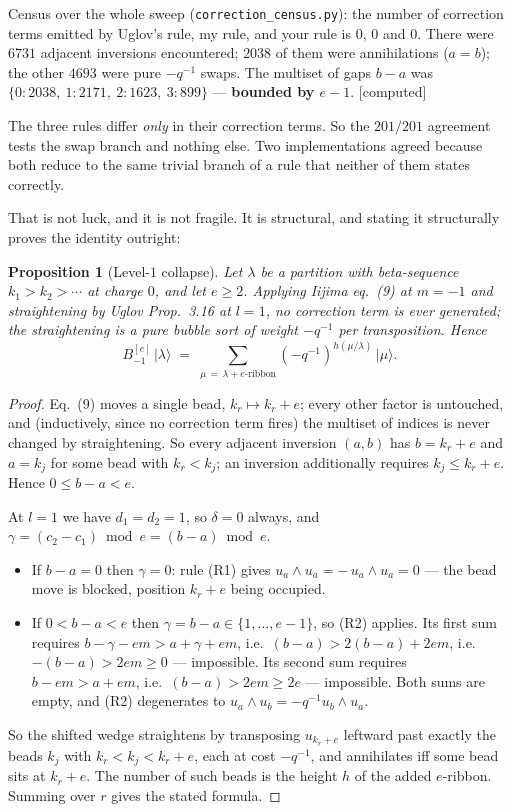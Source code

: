 \documentclass[11pt,a4paper]{article}
\newtheorem{proposition}{Proposition}
\theoremstyle{definition}
\newcommand{\gradecomputed}{\textsf{[computed]}}
\begin{document}
Census over the whole sweep (\texttt{correction\_census.py}): the number of correction
terms emitted by Uglov's rule, my rule, and your rule is $0$, $0$ and $0$. There were
$6731$ adjacent inversions encountered; $2038$ of them were annihilations ($a = b$); the
other $4693$ were pure $-q^{-1}$ swaps. The multiset of gaps $b-a$ was
$\{0 : 2038,\ 1 : 2171,\ 2 : 1623,\ 3 : 899\}$ --- \textbf{bounded by $e-1$}. \gradecomputed

The three rules differ \emph{only} in their correction terms. So the $201/201$ agreement
tests the swap branch and nothing else. Two implementations agreed because both reduce
to the same trivial branch of a rule that neither of them states correctly.

That is not luck, and it is not fragile. It is structural, and stating it structurally
proves the identity outright:

\begin{proposition}[Level-$1$ collapse]\label{prop:collapse}
Let $\lambda$ be a partition with beta-sequence $k_1 > k_2 > \cdots$ at charge $0$, and
let $e \ge 2$. Applying Iijima eq.~(9) at $m = -1$ and straightening by Uglov Prop.~3.16
at $l = 1$, no correction term is ever generated; the straightening is a pure bubble
sort of weight $-q^{-1}$ per transposition. Hence
\[
B^{[e]}_{-1}\,\lvert \lambda \rangle \;=\; \sum_{\mu \,=\, \lambda + e\text{-ribbon}} (-q^{-1})^{h(\mu/\lambda)}\, \lvert \mu \rangle .
\]
\end{proposition}

\begin{proof}
Eq.~(9) moves a single bead, $k_r \mapsto k_r + e$; every other factor is untouched, and
(inductively, since no correction term fires) the multiset of indices is never changed by
straightening. So every adjacent inversion $(a,b)$ has $b = k_r + e$ and $a = k_j$ for
some bead with $k_r < k_j$; an inversion additionally requires $k_j \le k_r + e$. Hence
$0 \le b - a < e$.

At $l = 1$ we have $d_1 = d_2 = 1$, so $\delta = 0$ always, and
$\gamma = (c_2 - c_1) \bmod e = (b-a) \bmod e$.
\begin{itemize}
\item If $b - a = 0$ then $\gamma = 0$: rule (R1) gives
$u_a \wedge u_a = -\,u_a \wedge u_a = 0$ --- the bead move is blocked, position
$k_r + e$ being occupied.
\item If $0 < b - a < e$ then $\gamma = b-a \in \{1,\dots,e-1\}$, so (R2) applies. Its
first sum requires $b - \gamma - em > a + \gamma + em$, i.e.\ $(b-a) > 2(b-a) + 2em$,
i.e.\ $-(b-a) > 2em \ge 0$ --- impossible. Its second sum requires $b - em > a + em$,
i.e.\ $(b-a) > 2em \ge 2e$ --- impossible. Both sums are empty, and (R2) degenerates to
$u_a \wedge u_b = -q^{-1} u_b \wedge u_a$.
\end{itemize}
So the shifted wedge straightens by transposing $u_{k_r + e}$ leftward past exactly the
beads $k_j$ with $k_r < k_j < k_r + e$, each at cost $-q^{-1}$, and annihilates iff some
bead sits at $k_r + e$. The number of such beads is the height $h$ of the added
$e$-ribbon. Summing over $r$ gives the stated formula.
\end{proof}
\end{document}
